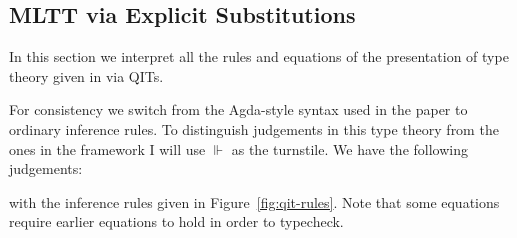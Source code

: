 \documentclass[10pt]{article}
\theoremstyle{definition}
\newcommand{\CTX}{\,\,\mathsf{Ctx}}
\newcommand{\TYPE}{\,\,\mathsf{Type}}
\begin{document}
\subsection{MLTT via Explicit Substitutions}
\newcommand{\qyields}{\Vdash}
\newcommand{\varsof}[1]{{#1}^\dagger}
\newcommand{\upstairs}[1]{\overline{#1}}
\newcommand{\downstairs}[1]{\underline{#1}}
\newcommand{\asdep}[1]{{#1}_p}
\newcommand\proj[1]{\ensuremath{\mathsf{proj}_{#1}}}
\newcommand\var[1]{\ensuremath{\mathsf{var}_{#1}}}

In this section we interpret all the rules and equations of the presentation of type theory given in \cite{altenkirchkaposi16qit} via QITs. 

For consistency we switch from the Agda-style syntax used in the paper to ordinary inference rules. To distinguish judgements in this type theory from the ones in the framework I will use $\qyields$ as the turnstile.  We have the following judgements:
with the inference rules given in Figure~\ref{fig:qit-rules}. Note that some equations require earlier equations to hold in order to typecheck.
\end{document}
